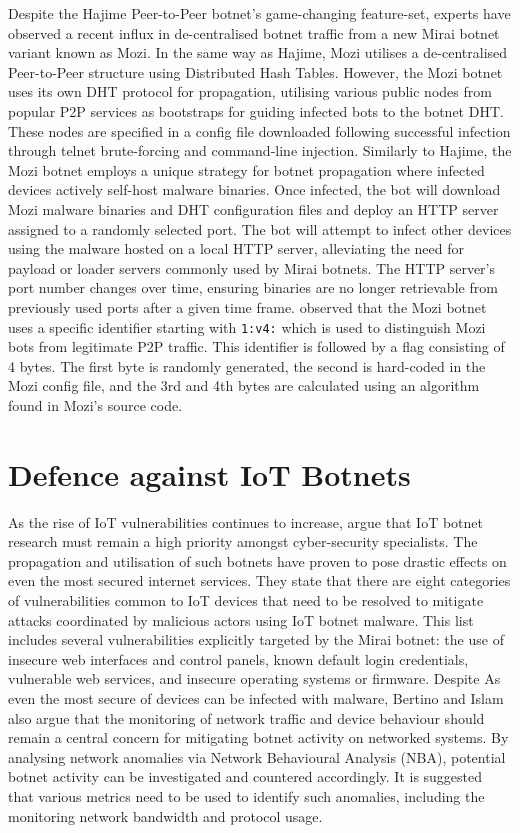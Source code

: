 Despite the Hajime Peer-to-Peer botnet's game-changing feature-set, experts have observed a recent influx in de-centralised botnet traffic from a new Mirai botnet variant known as Mozi. \citep{Netlab2019} In the same way as Hajime, Mozi utilises a de-centralised Peer-to-Peer structure using Distributed Hash Tables. However, the Mozi botnet uses its own DHT protocol for propagation, utilising various public nodes from popular P2P services as bootstraps for guiding infected bots to the botnet DHT. These nodes are specified in a config file downloaded following successful infection through telnet brute-forcing and command-line injection. Similarly to Hajime, the Mozi botnet employs a unique strategy for botnet propagation where infected devices actively self-host malware binaries. Once infected, the bot will download Mozi malware binaries and DHT configuration files and deploy an HTTP server assigned to a randomly selected port. The bot will attempt to infect other devices using the malware hosted on a local HTTP server, alleviating the need for payload or loader servers commonly used by Mirai botnets. The HTTP server's port number changes over time, ensuring binaries are no longer retrievable from previously used ports after a given time frame. \citet{Netlab2019} observed that the Mozi botnet uses a specific identifier starting with \texttt{1:v4:} which is used to distinguish Mozi bots from legitimate P2P traffic. This identifier is followed by a flag consisting of 4 bytes. The first byte is randomly generated, the second is hard-coded in the Mozi config file, and the 3rd and 4th bytes are calculated using an algorithm found in Mozi's source code.




\section{Defence against IoT Botnets}

As the rise of IoT vulnerabilities continues to increase, \citet{Bertino2017} argue that IoT botnet research must remain a high priority amongst cyber-security specialists. The propagation and utilisation of such botnets have proven to pose drastic effects on even the most secured internet services. They state that there are eight categories of vulnerabilities common to IoT devices that need to be resolved to mitigate attacks coordinated by malicious actors using IoT botnet malware. This list includes several vulnerabilities explicitly targeted by the Mirai botnet: the use of insecure web interfaces and control panels, known default login credentials, vulnerable web services, and insecure operating systems or firmware. Despite As even the most secure of devices can be infected with malware, Bertino and Islam also argue that the monitoring of network traffic and device behaviour should remain a central concern for mitigating botnet activity on networked systems. By analysing network anomalies via Network Behavioural Analysis (NBA), potential botnet activity can be investigated and countered accordingly. It is suggested that various metrics need to be used to identify such anomalies, including the monitoring network bandwidth and protocol usage.

